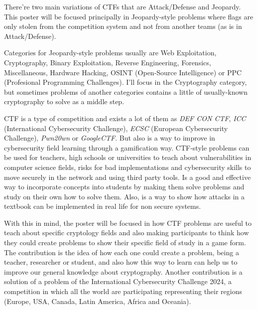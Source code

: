 \documentclass[runningheads]{llncs}
\begin{document}
  There're two main variations of CTFs that are Attack/Defense and Jeopardy.
  This poster will be focused principally in Jeopardy-style problems where flags are only 
  stolen from the competition system and not from another teams (as is in Attack/Defense).

  Categories for Jeopardy-style problems usually are Web Exploitation, Cryptography, Binary 
  Exploitation, Reverse Engineering, Forensics, Miscellaneous, Hardware Hacking, OSINT
  (Open-Source Intelligence) or PPC (Profesional Programming Challenges).
  I'll focus in the Cryptography category, but sometimes problems of another categories 
  contains a little of usually-known cryptography to solve as a middle step.

  CTF is a type of competition and exists a lot of them as \textit{DEF CON CTF}, \textit{ICC}
  (International Cybersecurity Challenge), \textit{ECSC} (European Cybersecurity Challenge),
  \textit{Pwn20wn} or \textit{GoogleCTF}.
  But also is a way to improve in cybersecurity field learning through a gamification way.
  CTF-style problems can be used for teachers, high schools or universities to teach about 
  vulnerabilities in computer science fields, risks for bad implementations and
  cybersecurity skills to move securely in the network and using third party tools.
  Is a good and effective way to incorporate concepts into students by making them solve 
  problems and study on their own how to solve them.
  Also, is a way to show how attacks in a textbook can be implemented in real life for non 
  secure systems.

  With this in mind, the poster will be focused in how CTF problems are useful to teach about 
  specific cryptology fields and also making participants to think how they could create 
  problems to show their specific field of study in a game form.
  The contribution is the idea of how each one could create a problem, being a teacher, researcher
  or student, and also how this way to learn can help us to improve our general knowledge
  about cryptography.
  Another contribution is a solution of a problem of the International Cybersecurity Challenge 
  2024, a competition in which all the world are participating representing their regions 
  (Europe, USA, Canada, Latin America, Africa and Oceania).
\end{document}
